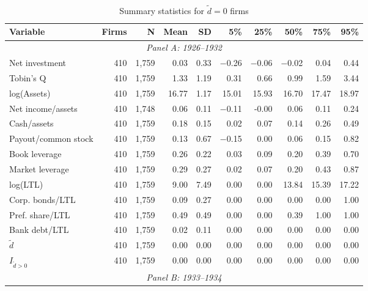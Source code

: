 \begin{table}[p]\centering
    \caption{\\ Summary statistics for $\tilde{d} = 0$ firms}\scriptsize
    \label{tabapp:summary_I_1}
    \begin{threeparttable}
        \begin{tabular}{lrrrrrrrrr}
            \toprule
            Variable & Firms & N & Mean & SD & 5\% & 25\% & 50\% & 75\% & 95\% \\
            \midrule
            \multicolumn{10}{c}{\textit{Panel A: 1926--1932}} \\
            \midrule
            Net investment & 410 & 1,759 & 0.03 & 0.33 & $-$0.26 & $-$0.06 & $-$0.02 & 0.04 & 0.44 \\
            Tobin's Q & 410 & 1,759 & 1.33 & 1.19 & 0.31 & 0.66 & 0.99 & 1.59 & 3.44 \\
            log(Assets) & 410 & 1,759 & 16.77 & 1.17 & 15.01 & 15.93 & 16.70 & 17.47 & 18.97 \\
            Net income/assets & 410 & 1,748 & 0.06 & 0.11 & $-$0.11 & -0.00 & 0.06 & 0.11 & 0.24 \\
            Cash/assets & 410 & 1,759 & 0.18 & 0.15 & 0.02 & 0.07 & 0.14 & 0.26 & 0.49 \\
            Payout/common stock & 410 & 1,759 & 0.13 & 0.67 & $-$0.15 & 0.00 & 0.06 & 0.15 & 0.82 \\
            Book leverage & 410 & 1,759 & 0.26 & 0.22 & 0.03 & 0.09 & 0.20 & 0.39 & 0.70 \\
            Market leverage & 410 & 1,759 & 0.29 & 0.27 & 0.02 & 0.07 & 0.20 & 0.43 & 0.87 \\
            log(LTL) & 410 & 1,759 & 9.00 & 7.49 & 0.00 & 0.00 & 13.84 & 15.39 & 17.22 \\
            Corp. bonds/LTL & 410 & 1,759 & 0.09 & 0.27 & 0.00 & 0.00 & 0.00 & 0.00 & 1.00 \\
            Pref. share/LTL & 410 & 1,759 & 0.49 & 0.49 & 0.00 & 0.00 & 0.39 & 1.00 & 1.00 \\
            Bank debt/LTL & 410 & 1,759 & 0.02 & 0.11 & 0.00 & 0.00 & 0.00 & 0.00 & 0.00 \\
            \ensuremath{\tilde{d}} & 410 & 1,759 & 0.00 & 0.00 & 0.00 & 0.00 & 0.00 & 0.00 & 0.00 \\
            \ensuremath{I_{\tilde{d}>0}} & 410 & 1,759 & 0.00 & 0.00 & 0.00 & 0.00 & 0.00 & 0.00 & 0.00 \\
            \midrule
            \multicolumn{10}{c}{\textit{Panel B: 1933--1934}} \\

\end{tabular}
\end{threeparttable}
\end{table}
